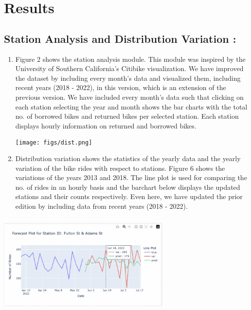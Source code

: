 \documentclass[journal]{vgtc}                     %
\begin{document}
\section{Results}
\subsection{Station Analysis and Distribution Variation \cite{11}:}
\begin{enumerate}
    \item Figure 2 shows the station analysis module. This module was inspired by the University of Southern California's Citibike visualization. We have improved the dataset by including every month's data and visualized them, including recent years (2018 - 2022), in this version, which is an extension of the previous version. We have included every month's data such that clicking on each station selecting the year and month shows the bar charts with the total no. of borrowed bikes and returned bikes per selected station. Each station displays hourly information on returned and borrowed bikes.
    
    \parbox{\linewidth}{
        \texttt{[image: figs/dist.png]}\\
        }
    \item Distribution variation shows the statistics of the yearly data and the yearly variation of the bike rides with respect to stations. Figure 6 shows the variations of the years 2013 and 2018. The line plot is used for comparing the no. of rides in an hourly basis and the barchart below displays the updated stations and their counts respectively. Even here, we have updated the prior edition by including data from recent years (2018 - 2022).
\end{enumerate}
\parbox{\linewidth}{
        \includegraphics[width=3.4in, height=2in]{figs/forecast.png}\\
        }
\end{document}

